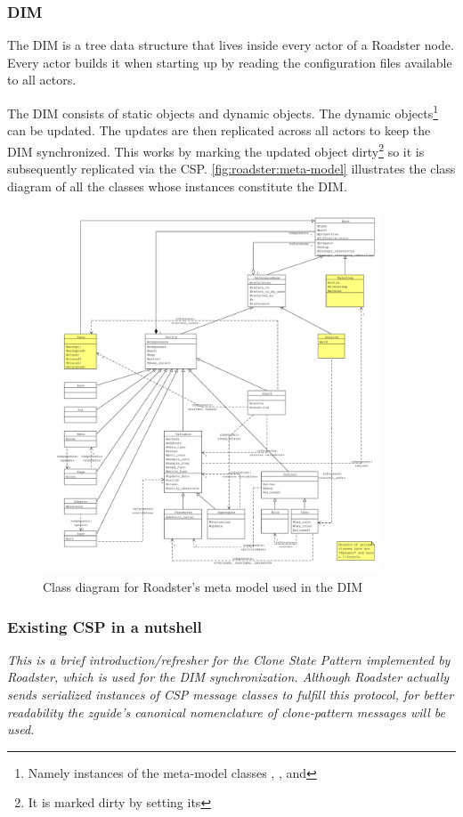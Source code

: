 \subsubsection{DIM}
The \acrfull{DIM} is a tree data structure that lives inside every actor of a Roadster
node. Every actor builds it when starting up by reading the configuration
files available to all actors.

The DIM consists of static objects and dynamic objects. The dynamic
objects\footnote{Namely instances of the meta-model classes ,
, and } can be updated. The updates are then
replicated across all actors to keep the DIM synchronized. This works by
marking the updated object dirty\footnote{It is marked dirty by setting its
} so it is subsequently replicated via the
\gls{CSP}. \autoref{fig:roadster:meta-model} illustrates the class diagram of
all the classes whose instances constitute the DIM.

\begin{figure}[]
	\includegraphics[trim=1.5cm 1cm 1cm 1cm, clip=true, width=0.9\textwidth]{img/meta_model.pdf}
	\caption{Class diagram for Roadster's meta model used in the DIM}
	\label{fig:roadster:meta-model}
\end{figure}

\subsubsection{Existing CSP in a nutshell}
\emph{This is a brief introduction/refresher for the Clone State Pattern
implemented by Roadster, which is used for the DIM synchronization. Although Roadster actually sends serialized instances
of CSP message classes to fulfill this protocol, for better readability the
\gls{zguide}'s canonical nomenclature of \gls{clone-pattern} messages will be used.}

